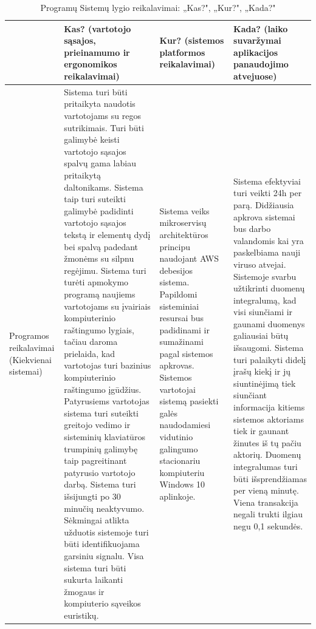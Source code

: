 \documentclass{VUMIFPSkursinis}
\begin{document}
\begin{center}
\begin{longtable}{|L{4cm}|L{4cm}|L{4cm}|L{4cm}|}
\end{longtable}


\begin{longtable}{|L{4cm}|L{4cm}|L{4cm}|L{4cm}|}

\caption{Programų Sistemų lygio reikalavimai: „Kas?", „Kur?", „Kada?"}
\label{table:PSReq-WhoWhereWhen} \\ \hline
		                           & Kas? (vartotojo sąsajos, prieinamumo ir ergonomikos reikalavimai) & Kur? (sistemos platformos reikalavimai) & Kada? (laiko suvaržymai aplikacijos panaudojimo atvejuose) \\ \hline
		Programos reikalavimai (Kiekvienai sistemai) &

		Sistema turi būti pritaikyta naudotis vartotojams su regos sutrikimais.
		Turi būti galimybė keisti vartotojo sąsajos spalvų gama labiau pritaikytą daltonikams.
		Sistema taip turi suteikti galimybė padidinti vartotojo sąsajos tekstą ir elementų dydį bei spalvą
		padedant žmonėms su silpnu regėjimu.
		Sistema turi turėti apmokymo programą naujiems vartotojams su įvairiais kompiuterinio raštingumo lygiais,
		tačiau daroma prielaida, kad vartotojas turi bazinius kompiuterinio raštingumo įgūdžius.
		Patyrusiems vartotojas sistema turi suteikti greitojo vedimo ir sisteminių klaviatūros trumpinių galimybę taip pagreitinant patyrusio vartotojo darbą.
		Sistema turi išsijungti po 30 minučių neaktyvumo.
		Sėkmingai atlikta užduotis sistemoje turi būti identifikuojama garsiniu signalu.
		Visa sistema turi būti sukurta laikanti žmogaus ir kompiuterio sąveikos euristikų.

		                           &

		Sistema veiks mikroservisų architektūros principu naudojant AWS debesijos sistema.
		Papildomi sisteminiai resursai bus padidinami ir sumažinami pagal sistemos apkrovas.
		Sistemos vartotojai sistemą pasiekti galės naudodamiesi vidutinio galingumo stacionariu kompiuteriu Windows 10 aplinkoje.

		                           &

		Sistema efektyviai turi veikti 24h per parą.
		Didžiausia apkrova sistemai bus darbo valandomis kai yra paskelbiama nauji viruso atvejai.
		Sistemoje svarbu užtikrinti duomenų integralumą, kad visi siunčiami ir gaunami duomenys galiausiai būtų išsaugomi.
		Sistema turi palaikyti didelį įrašų kiekį ir jų siuntinėjimą tiek siunčiant informacija kitiems sistemos aktoriams tiek ir gaunant žinutes iš tų pačiu aktorių.
		Duomenų integralumas turi būti išsprendžiamas per vieną minutę.
		Viena transakcija negali trukti ilgiau negu 0,1 sekundės.

		\\ \hline

\end{longtable}
\end{center}
\end{document}

